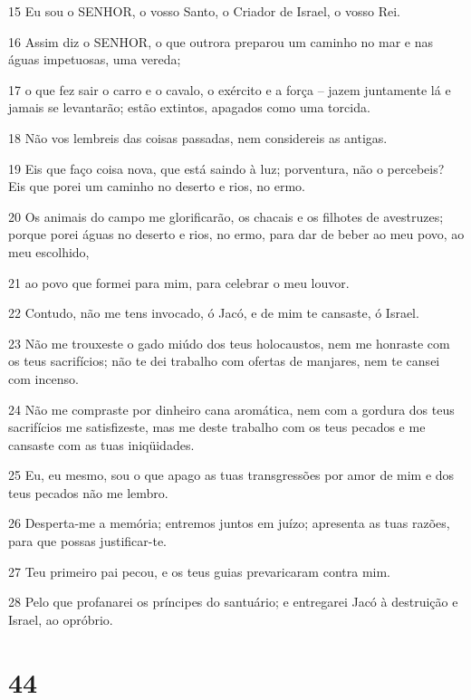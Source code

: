 \par 15 Eu sou o SENHOR, o vosso Santo, o Criador de Israel, o vosso Rei.
\par 16 Assim diz o SENHOR, o que outrora preparou um caminho no mar e nas águas impetuosas, uma vereda;
\par 17 o que fez sair o carro e o cavalo, o exército e a força -- jazem juntamente lá e jamais se levantarão; estão extintos, apagados como uma torcida.
\par 18 Não vos lembreis das coisas passadas, nem considereis as antigas.
\par 19 Eis que faço coisa nova, que está saindo à luz; porventura, não o percebeis? Eis que porei um caminho no deserto e rios, no ermo.
\par 20 Os animais do campo me glorificarão, os chacais e os filhotes de avestruzes; porque porei águas no deserto e rios, no ermo, para dar de beber ao meu povo, ao meu escolhido,
\par 21 ao povo que formei para mim, para celebrar o meu louvor.
\par 22 Contudo, não me tens invocado, ó Jacó, e de mim te cansaste, ó Israel.
\par 23 Não me trouxeste o gado miúdo dos teus holocaustos, nem me honraste com os teus sacrifícios; não te dei trabalho com ofertas de manjares, nem te cansei com incenso.
\par 24 Não me compraste por dinheiro cana aromática, nem com a gordura dos teus sacrifícios me satisfizeste, mas me deste trabalho com os teus pecados e me cansaste com as tuas iniqüidades.
\par 25 Eu, eu mesmo, sou o que apago as tuas transgressões por amor de mim e dos teus pecados não me lembro.
\par 26 Desperta-me a memória; entremos juntos em juízo; apresenta as tuas razões, para que possas justificar-te.
\par 27 Teu primeiro pai pecou, e os teus guias prevaricaram contra mim.
\par 28 Pelo que profanarei os príncipes do santuário; e entregarei Jacó à destruição e Israel, ao opróbrio.

\chapter{44}

